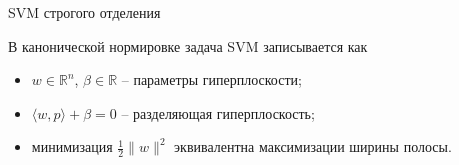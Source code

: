 \SPBGContentSlide
  {SVM строгого отделения}
  {%
    \FormulaBody

    В канонической нормировке задача SVM записывается как


    \vspace{.35cm}

    \begin{itemize}
      \item \(w\in\mathbb{R}^n\), \(\beta\in\mathbb{R}\) -- параметры гиперплоскости;
      \item \(\langle w,p\rangle+\beta=0\) -- разделяющая гиперплоскость;
      \item минимизация \(\frac12\|w\|^2\) эквивалентна максимизации ширины полосы.
    \end{itemize}
  }
